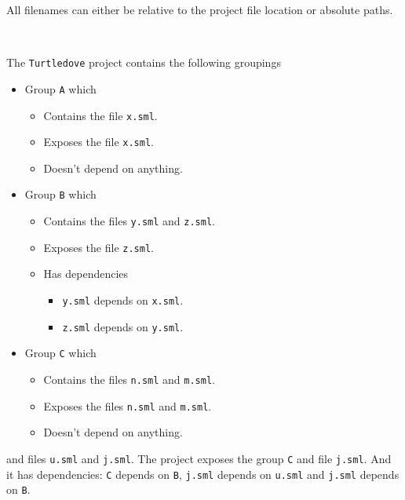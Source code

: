 \begin{description}
  All filenames can either be relative to the project file location or absolute
  paths.


  \begin{example}\ 
    \label{ex:Sample-project-file-turtledove}

    The \texttt{Turtledove} project contains the following groupings

    \begin{itemize}
    \item Group \texttt{A} which
      \begin{itemize}
      \item Contains the file \texttt{x.sml}.
      \item Exposes the file \texttt{x.sml}.
      \item Doesn't depend on anything.
      \end{itemize}

    \item Group \texttt{B} which
      \begin{itemize}
      \item Contains the files \texttt{y.sml} and \texttt{z.sml}.
      \item Exposes the file \texttt{z.sml}.
      \item Has dependencies
        \begin{itemize}
        \item \texttt{y.sml} depends on \texttt{x.sml}.
        \item \texttt{z.sml} depends on \texttt{y.sml}.
        \end{itemize}
      \end{itemize}

    \item Group \texttt{C} which
      \begin{itemize}
      \item Contains the files \texttt{n.sml} and \texttt{m.sml}.
      \item Exposes the files \texttt{n.sml} and \texttt{m.sml}.
      \item Doesn't depend on anything.
      \end{itemize}
    \end{itemize}

    and files \texttt{u.sml} and \texttt{j.sml}. The project exposes the group
    \texttt{C} and file \texttt{j.sml}. And it has dependencies: \texttt{C}
    depends on \texttt{B}, \texttt{j.sml} depends on \texttt{u.sml} and
    \texttt{j.sml} depends on \texttt{B}.
    

\end{example}
\end{description}
